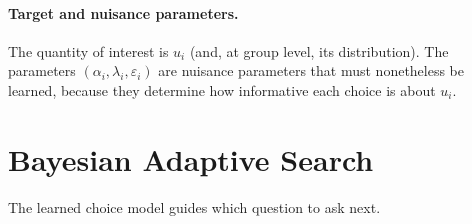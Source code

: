 \documentclass[11pt,a4paper]{article}
\begin{document}
\paragraph{Target and nuisance parameters.}
The quantity of interest is $u_i$ (and, at group level, its distribution). The parameters $(\alpha_i,\lambda_i,\varepsilon_i)$ are nuisance parameters that must nonetheless be learned, because they determine how informative each choice is about $u_i$.

\section{Bayesian Adaptive Search}
\label{sec:algorithm}

The learned choice model guides which question to ask next.
\end{document}

